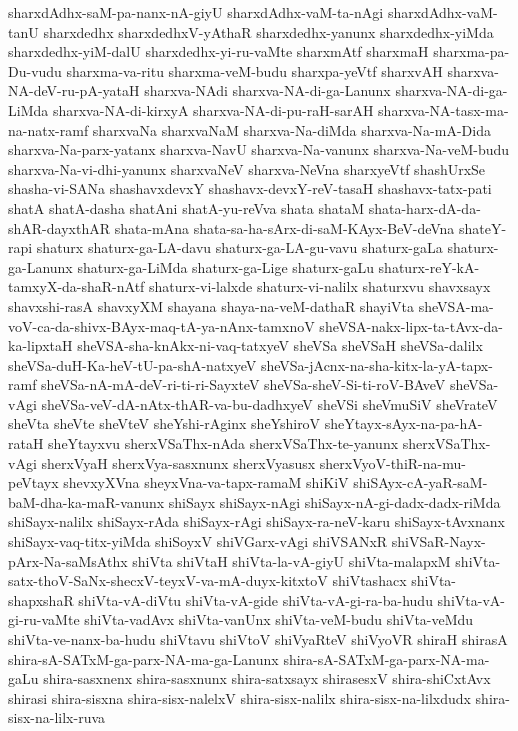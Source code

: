 {sharxdAdhx-saM-pa-nanx-nA-giyU
sharxdAdhx-vaM-ta-nAgi
sharxdAdhx-vaM-tanU
sharxdedhx
sharxdedhxV-yAthaR
sharxdedhx-yanunx
sharxdedhx-yiMda
sharxdedhx-yiM-dalU
sharxdedhx-yi-ru-vaMte
sharxmAtf
sharxmaH
sharxma-pa-Du-vudu
sharxma-va-ritu
sharxma-veM-budu
sharxpa-yeVtf
sharxvAH
sharxva-NA-deV-ru-pA-yataH
sharxva-NAdi
sharxva-NA-di-ga-Lanunx
sharxva-NA-di-ga-LiMda
sharxva-NA-di-kirxyA
sharxva-NA-di-pu-raH-sarAH
sharxva-NA-tasx-ma-na-natx-ramf
sharxvaNa
sharxvaNaM
sharxva-Na-diMda
sharxva-Na-mA-Dida
sharxva-Na-parx-yatanx
sharxva-NavU
sharxva-Na-vanunx
sharxva-Na-veM-budu
sharxva-Na-vi-dhi-yanunx
sharxvaNeV
sharxva-NeVna
sharxyeVtf
shashUrxSe
shasha-vi-SANa
shashavxdevxY
shashavx-devxY-reV-tasaH
shashavx-tatx-pati
shatA
shatA-dasha
shatAni
shatA-yu-reVva
shata
shataM
shata-harx-dA-da-shAR-dayxthAR
shata-mAna
shata-sa-ha-sArx-di-saM-KAyx-BeV-deVna
shateY-rapi
shaturx
shaturx-ga-LA-davu
shaturx-ga-LA-gu-vavu
shaturx-gaLa
shaturx-ga-Lanunx
shaturx-ga-LiMda
shaturx-ga-Lige
shaturx-gaLu
shaturx-reY-kA-tamxyX-da-shaR-nAtf
shaturx-vi-lalxde
shaturx-vi-nalilx
shaturxvu
shavxsayx
shavxshi-rasA
shavxyXM
shayana
shaya-na-veM-dathaR
shayiVta
sheVSA-ma-voV-ca-da-shivx-BAyx-maq-tA-ya-nAnx-tamxnoV
sheVSA-nakx-lipx-ta-tAvx-da-ka-lipxtaH
sheVSA-sha-knAkx-ni-vaq-tatxyeV
sheVSa
sheVSaH
sheVSa-dalilx
sheVSa-duH-Ka-heV-tU-pa-shA-natxyeV
sheVSa-jAcnx-na-sha-kitx-la-yA-tapx-ramf
sheVSa-nA-mA-deV-ri-ti-ri-SayxteV
sheVSa-sheV-Si-ti-roV-BAveV
sheVSa-vAgi
sheVSa-veV-dA-nAtx-thAR-va-bu-dadhxyeV
sheVSi
sheVmuSiV
sheVrateV
sheVta
sheVte
sheVteV
sheYshi-rAginx
sheYshiroV
sheYtayx-sAyx-na-pa-hA-rataH
sheYtayxvu
sherxVSaThx-nAda
sherxVSaThx-te-yanunx
sherxVSaThx-vAgi
sherxVyaH
sherxVya-sasxnunx
sherxVyasusx
sherxVyoV-thiR-na-mu-peVtayx
shevxyXVna
sheyxVna-va-tapx-ramaM
shiKiV
shiSAyx-cA-yaR-saM-baM-dha-ka-maR-vanunx
shiSayx
shiSayx-nAgi
shiSayx-nA-gi-dadx-dadx-riMda
shiSayx-nalilx
shiSayx-rAda
shiSayx-rAgi
shiSayx-ra-neV-karu
shiSayx-tAvxnanx
shiSayx-vaq-titx-yiMda
shiSoyxV
shiVGarx-vAgi
shiVSANxR
shiVSaR-Nayx-pArx-Na-saMsAthx
shiVta
shiVtaH
shiVta-la-vA-giyU
shiVta-malapxM
shiVta-satx-thoV-SaNx-shecxV-teyxV-va-mA-duyx-kitxtoV
shiVtashacx
shiVta-shapxshaR
shiVta-vA-diVtu
shiVta-vA-gide
shiVta-vA-gi-ra-ba-hudu
shiVta-vA-gi-ru-vaMte
shiVta-vadAvx
shiVta-vanUnx
shiVta-veM-budu
shiVta-veMdu
shiVta-ve-nanx-ba-hudu
shiVtavu
shiVtoV
shiVyaRteV
shiVyoVR
shiraH
shirasA
shira-sA-SATxM-ga-parx-NA-ma-ga-Lanunx
shira-sA-SATxM-ga-parx-NA-ma-gaLu
shira-sasxnenx
shira-sasxnunx
shira-satxsayx
shirasesxV
shira-shiCxtAvx
shirasi
shira-sisxna
shira-sisx-nalelxV
shira-sisx-nalilx
shira-sisx-na-lilxdudx
shira-sisx-na-lilx-ruva
}
